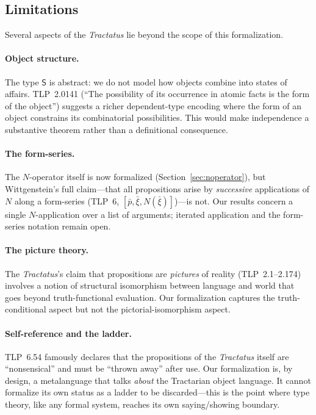 \documentclass[10pt, letterpaper]{article}
\theoremstyle{definition}
\theoremstyle{remark}
\newcommand{\Sach}{\mathsf{S}}
\begin{document}
\subsection{Limitations}
\label{sec:limitations}

Several aspects of the \emph{Tractatus} lie beyond the scope of
this formalization.

\paragraph{Object structure.}
The type $\Sach$ is abstract: we do not model how objects combine
into states of affairs.  TLP~2.0141 (``The possibility of its
occurrence in atomic facts is the form of the object'') suggests
a richer dependent-type encoding where the form of an object
constrains its combinatorial possibilities.  This would make
independence a substantive theorem rather than a definitional
consequence.

\paragraph{The form-series.}
The $N$-operator itself is now formalized
(Section~\ref{sec:noperator}), but Wittgenstein's full
claim---that all propositions arise by \emph{successive}
applications of $N$ along a form-series
(TLP~6, $[\bar{p}, \bar{\xi}, N(\bar{\xi})]$)---is not.  Our
results concern a single $N$-application over a list of
arguments; iterated application and the form-series notation
remain open.

\paragraph{The picture theory.}
The \emph{Tractatus}'s claim that propositions are
\emph{pictures} of reality (TLP~2.1--2.174) involves a notion
of structural isomorphism between language and world that goes
beyond truth-functional evaluation.  Our formalization captures
the truth-conditional aspect but not the pictorial-isomorphism
aspect.

\paragraph{Self-reference and the ladder.}
TLP~6.54 famously declares that the propositions of the
\emph{Tractatus} itself are ``nonsensical'' and must be ``thrown
away'' after use.  Our formalization is, by design, a
metalanguage that talks \emph{about} the Tractarian object
language.  It cannot formalize its own status as a ladder to be
discarded---this is the point where type theory, like any formal
system, reaches its own saying/showing boundary.
\end{document}
